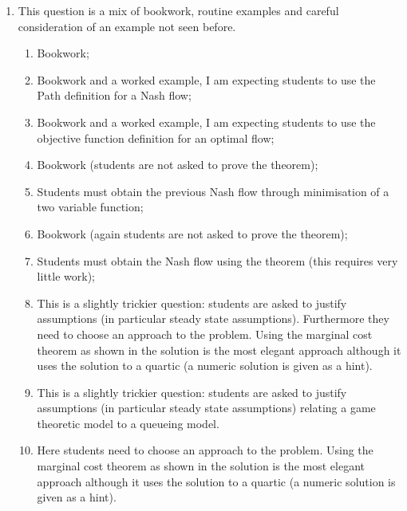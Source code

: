 \documentclass[12pt,a4paper]{article}
\begin{document}
\begin{enumerate}
\item This question is a mix of bookwork, routine examples and careful consideration of an example not seen before.

    \begin{enumerate}
        \item Bookwork;
        \item Bookwork and a worked example, I am expecting students to use the Path definition for a Nash flow;
        \item Bookwork and a worked example, I am expecting students to use the objective function definition for an optimal flow;
        \item Bookwork (students are not asked to prove the theorem);
        \item Students must obtain the previous Nash flow through minimisation of a two variable function;
        \item Bookwork (again students are not asked to prove the theorem);
        \item Students must obtain the Nash flow using the theorem (this requires very little work);
        \item This is a slightly trickier question: students are asked to justify assumptions (in particular steady state assumptions). Furthermore they need to choose an approach to the problem. Using the marginal cost theorem as shown in the solution is the most elegant approach although it uses the solution to a quartic (a numeric solution is given as a hint).
        \item This is a slightly trickier question: students are asked to justify assumptions (in particular steady state assumptions) relating a game theoretic model to a queueing model.
        \item Here students need to choose an approach to the problem. Using the marginal cost theorem as shown in the solution is the most elegant approach although it uses the solution to a quartic (a numeric solution is given as a hint).
    \end{enumerate}
\end{enumerate}
\end{document}
